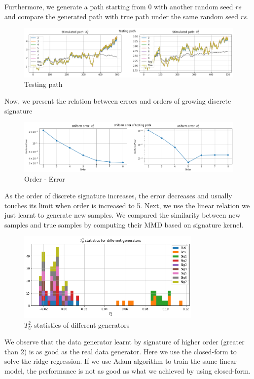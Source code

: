 \documentclass[12pt]{report}
\theoremstyle{definition}
\theoremstyle{remark}
\begin{document}
Furthermore, we generate a path starting from $0$ with another random seed $rs$ and compare the generated path with true path under the same random seed $rs$. 
\begin{figure}[H]
    \centering
    \includegraphics[width=\textwidth]{figs/res3.png}
    \caption{Testing path}
\end{figure}
Now, we present the relation between errors and orders of growing discrete signature 
 \begin{figure}[H]
    \centering
    \includegraphics[width=\textwidth]{figs/res4.png}
    \caption{ Order - Error}
\end{figure}
As the order of discrete signature increases, the error decreases and usually touches its limit when order is increased to 5. 
Next, we use the linear relation we just learnt to generate new samples. We compared the similarity between new samples and true samples by computing their MMD based on signature kernel.
\begin{figure}[H]
  \centering
  \includegraphics[width=0.8\textwidth]{figs/res5.png}
  \caption{$T_{U}^{2}$ statistics of different generators}
\end{figure}
We observe that the data generator learnt by signature of higher order (greater than 2) is as good as the real data generator. Here we use the closed-form to solve the ridge regression. If we use Adam algorithm to train the same linear model, the performance is not as good as what we achieved by using closed-form. 
\end{document}
